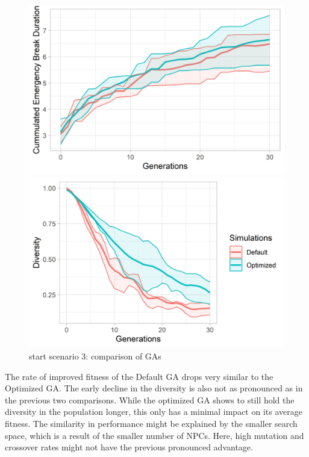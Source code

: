 \begin{figure}[ht] 
	\begin{minipage}[b]{0.5\linewidth}
		\centering
		\includegraphics[width=1\linewidth]{simulations/evaluation/plots/sim_3_ga_generations} 
	\end{minipage}%
	\begin{minipage}[b]{0.5\linewidth}
		\centering
		\includegraphics[width=1\linewidth]{simulations/evaluation/plots/sim_3_ga_diversity} 
	\end{minipage} 
	\caption{start scenario 3: comparison of GAs}
	\label{fig:evaluation:sim_3_ga_comparison}
\end{figure}


The rate of improved fitness of the Default GA drops very similar to the Optimized GA. The early decline in the diversity is also not as pronounced as in the previous two comparisons. While the optimized GA shows to still hold the diversity in the population longer, this only has a minimal impact on its average fitness. The similarity in performance might be explained by the smaller search space, which is a result of the smaller number of NPCs. Here, high mutation and crossover rates might not have the previous pronounced advantage.

